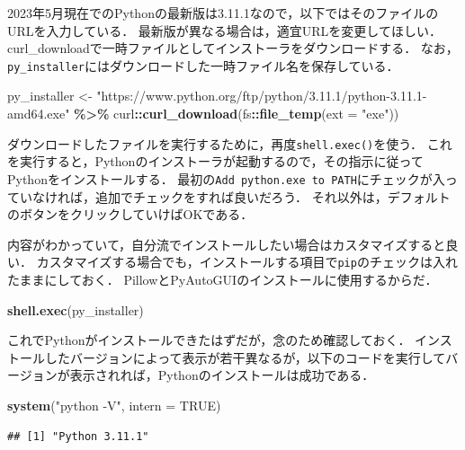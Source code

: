 \documentclass[
]{article}
\newenvironment{Shaded}{\begin{snugshade}}{\end{snugshade}}
\newcommand{\AttributeTok}[1]{\textcolor[rgb]{0.13,0.29,0.53}{#1}}
\newcommand{\ConstantTok}[1]{\textcolor[rgb]{0.56,0.35,0.01}{#1}}
\newcommand{\FunctionTok}[1]{\textcolor[rgb]{0.13,0.29,0.53}{\textbf{#1}}}
\newcommand{\NormalTok}[1]{#1}
\newcommand{\OtherTok}[1]{\textcolor[rgb]{0.56,0.35,0.01}{#1}}
\newcommand{\SpecialCharTok}[1]{\textcolor[rgb]{0.81,0.36,0.00}{\textbf{#1}}}
\newcommand{\StringTok}[1]{\textcolor[rgb]{0.31,0.60,0.02}{#1}}
\begin{document}
2023年5月現在でのPythonの最新版は3.11.1なので，以下ではそのファイルのURLを入力している．
最新版が異なる場合は，適宜URLを変更してほしい．
curl\_downloadで一時ファイルとしてインストーラをダウンロードする．
なお，\texttt{py\_installer}にはダウンロードした一時ファイル名を保存している．

\begin{Shaded}
\begin{Highlighting}[]
\NormalTok{py\_installer }\OtherTok{\textless{}{-}} 
  \StringTok{"https://www.python.org/ftp/python/3.11.1/python{-}3.11.1{-}amd64.exe"} \SpecialCharTok{\%\textgreater{}\%}
\NormalTok{  curl}\SpecialCharTok{::}\FunctionTok{curl\_download}\NormalTok{(fs}\SpecialCharTok{::}\FunctionTok{file\_temp}\NormalTok{(}\AttributeTok{ext =} \StringTok{"exe"}\NormalTok{))}
\end{Highlighting}
\end{Shaded}

ダウンロードしたファイルを実行するために，再度\texttt{shell.exec()}を使う．
これを実行すると，Pythonのインストーラが起動するので，その指示に従ってPythonをインストールする．
最初の\texttt{Add\ python.exe\ to\ PATH}にチェックが入っていなければ，追加でチェックをすれば良いだろう．
それ以外は，デフォルトのボタンをクリックしていけばOKである．

内容がわかっていて，自分流でインストールしたい場合はカスタマイズすると良い．
カスタマイズする場合でも，インストールする項目で\texttt{pip}のチェックは入れたままにしておく．
PillowとPyAutoGUIのインストールに使用するからだ．

\begin{Shaded}
\begin{Highlighting}[]
\FunctionTok{shell.exec}\NormalTok{(py\_installer)}
\end{Highlighting}
\end{Shaded}

これでPythonがインストールできたはずだが，念のため確認しておく．
インストールしたバージョンによって表示が若干異なるが，以下のコードを実行してバージョンが表示されれば，Pythonのインストールは成功である．

\begin{Shaded}
\begin{Highlighting}[]
\FunctionTok{system}\NormalTok{(}\StringTok{"python {-}V"}\NormalTok{, }\AttributeTok{intern =} \ConstantTok{TRUE}\NormalTok{)}
\end{Highlighting}
\end{Shaded}

\begin{verbatim}
## [1] "Python 3.11.1"
\end{verbatim}
\end{document}
